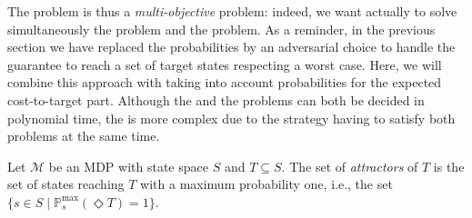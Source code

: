 The \SSPWE{} problem is thus a \textit{multi-objective} problem: indeed, we want actually to solve simultaneously the \SPG{} problem and the \SSPE{} problem.
As a reminder, in the previous section we have replaced the probabilities by an adversarial choice to handle the guarantee to reach a set of target states respecting a worst case.
Here, we will combine this approach with taking into account probabilities for the expected cost-to-target part.
Although the \SSPE{} and the \SPG{} problems can both be decided in polynomial time, the \SSPWE{} is more complex due to the strategy having to satisfy both problems at the same time.

\begin{definition}
  Let $\mathcal{M}$ be an MDP with state space $S$ and $T \subseteq S$. The set of \textit{attractors} of $T$ is the set of states reaching $T$ with a maximum probability one, i.e., the set $\{ s \in S \; | \; \mathbb{P}^{\max}_s (\Diamond T) = 1 \}$.
\end{definition}


